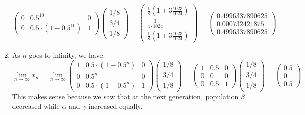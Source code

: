 \documentclass[11pt, legalpaper]{article}
\begin{document}
\begin{enumerate}
$${\begin{pmatrix}
        0 & 0.5^{10} & 0 \\
        0 & 0.5\cdot(1-0.5^{10}) & 1
    \end{pmatrix} \begin{pmatrix} 1/8 \\ 3/4 \\ 1/8 \end{pmatrix}=\begin{pmatrix}\frac{1}{8}(1+3\frac{1023}{1024}) \\ \frac{3}{4\cdot 1024} \\ \frac{1}{8}(1+3\frac{1023}{1024})\end{pmatrix}=\begin{pmatrix}0.4996337890625 \\ 0.000732421875 \\ 0.4996337890625\end{pmatrix}}$$

    \item As $n$ goes to infinity, we have:
    $$\lim_{n\to \infty}x_n=\lim_{n\to \infty}\begin{pmatrix}
        1 & 0.5\cdot(1-0.5^n) & 0 \\
        0 & 0.5^n & 0 \\
        0 & 0.5\cdot(1-0.5^n) & 1
    \end{pmatrix}\begin{pmatrix} 1/8 \\ 3/4 \\ 1/8 \end{pmatrix}=\begin{pmatrix} 1 & 0.5 & 0 \\
        0 & 0& 0 \\
        0 & 0.5 & 1\end{pmatrix}\begin{pmatrix} 1/8 \\ 3/4 \\ 1/8 \end{pmatrix}=\begin{pmatrix} 0.5 \\ 0 \\ 0.5 \end{pmatrix}$$
    This makes sense because we saw that at the next generation, population $\beta$ decreased while $\alpha$ and $\gamma$ increased equally.
    

\end{enumerate}
\end{document}
